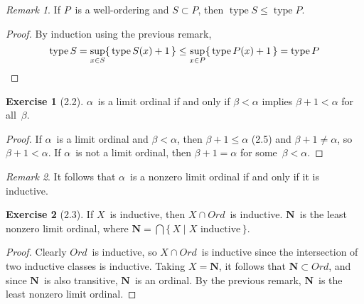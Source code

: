 \documentclass[letterpaper,12pt]{article}
\newcommand{\N}{\boldsymbol{N}}
\newcommand{\Ord}{\mathit{Ord}}
\newcommand{\sect}{\cap}
\newcommand{\bigsect}{\bigcap}
\DeclareMathOperator{\type}{type}
\theoremstyle{definition}
\newtheorem*{exer}{Exercise}
\theoremstyle{remark}
\newtheorem*{rmk}{Remark}
\begin{document}
\begin{rmk}
If \(P\)~is a well-ordering and \(S\subset P\), then \(\type S\le\type P\).
\end{rmk}
\begin{proof}
By induction using the previous remark,
\[\type S=\sup_{x\in S}\{\,\type S(x)+1\,\}\le\sup_{x\in P}\{\,\type P(x)+1\,\}=\type P\qedhere\]
\end{proof}

\begin{exer}[2.2]
\(\alpha\)~is a limit ordinal if and only if \(\beta<\alpha\) implies \(\beta+1<\alpha\) for all~\(\beta\).
\end{exer}
\begin{proof}
If \(\alpha\)~is a limit ordinal and \(\beta<\alpha\), then \(\beta+1\le\alpha\) (2.5) and \(\beta+1\ne\alpha\), so \(\beta+1<\alpha\). If \(\alpha\)~is not a limit ordinal, then \(\beta+1=\alpha\) for some~\(\beta<\alpha\).
\end{proof}
\begin{rmk}
It follows that \(\alpha\)~is a nonzero limit ordinal if and only if it is inductive.
\end{rmk}

\begin{exer}[2.3]
If \(X\)~is inductive, then \(X\sect\Ord\)~is inductive. \(\N\)~is the least nonzero limit ordinal, where \(\N=\bigsect\{\,X\mid X\text{ inductive}\,\}\).
\end{exer}
\begin{proof}
Clearly \(\Ord\)~is inductive, so \(X\sect\Ord\)~is inductive since the intersection of two inductive classes is inductive. Taking \(X=\N\), it follows that \(\N\subset\Ord\), and since \(\N\)~is also transitive, \(\N\)~is an ordinal. By the previous remark, \(\N\)~is the least nonzero limit ordinal.
\end{proof}
\end{document}
